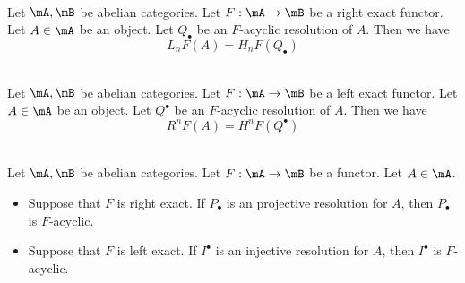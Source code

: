 \documentclass[a4paper]{article}
\begin{document}
\begin{prp}{}{}\\
Let $\mA,\mB$ be abelian categories. Let $F:\mA\to\mB$ be a right exact functor. Let $A\in\mA$ be an object. Let $Q_\bullet$ be an $F$-acyclic resolution of $A$. Then we have $$L_nF(A)=H_nF(Q_\bullet)$$
\end{prp}

\begin{prp}{}{}\\
Let $\mA,\mB$ be abelian categories. Let $F:\mA\to\mB$ be a left exact functor. Let $A\in\mA$ be an object. Let $Q^\bullet$ be an $F$-acyclic resolution of $A$. Then we have $$R^nF(A)=H^nF(Q^\bullet)$$
\end{prp}

\begin{lmm}{}{}\\
Let $\mA,\mB$ be abelian categories. Let $F:\mA\to\mB$ be a functor. Let $A\in\mA$. 
\begin{itemize}
\item Suppose that $F$ is right exact. If $P_\bullet$ is an projective resolution for $A$, then $P_\bullet$ is $F$-acyclic. 
\item Suppose that $F$ is left exact. If $I^\bullet$ is an injective resolution for $A$, then $I^\bullet$ is $F$-acyclic. 
\end{itemize}
\end{lmm}
\end{document}
